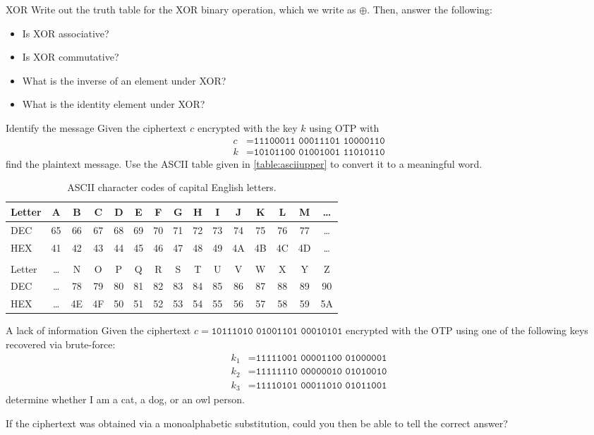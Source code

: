 \documentclass{practice}
\begin{document}
\begin{task}{XOR}
  Write out the truth table for the XOR binary operation, which we write as $\oplus$.
  Then, answer the following:
  \begin{itemize}
    \item Is XOR associative?
    \item Is XOR commutative?
    \item What is the inverse of an element under XOR?
    \item What is the identity element under XOR?
  \end{itemize}
\end{task}

\begin{task}{Identify the message}
  Given the ciphertext $c$ encrypted with the key $k$ using OTP with
  \begin{align*}
    c &= \texttt{11100011 00011101 10000110}\\
    k &= \texttt{10101100 01001001 11010110}
  \end{align*}
  find the plaintext message.
  Use the ASCII table given in \autoref{table:asciiupper} to convert it to a meaningful word.

  \begin{table}[h!]
    \centering
    \begin{tabular}{@{}lcccccccccccccc@{}}
      Letter & A  & B  & C  & D  & E  & F  & G  & H  & I  & J  & K  & L  & M & \dots\\\midrule
      DEC & 65 & 66 & 67 & 68 & 69 & 70 & 71 & 72 & 73 & 74 & 75 & 76 & 77 & \dots\\
      HEX & 41 & 42 & 43 & 44 & 45 & 46 & 47 & 48 & 49 & 4A & 4B & 4C & 4D & \dots\\\\
      Letter & \dots & N  & O  & P  & Q  & R  & S  & T  & U  & V  & W  & X  & Y  & Z\\\midrule
      DEC & \dots & 78 & 79 & 80 & 81 & 82 & 83 & 84 & 85 & 86 & 87 & 88 & 89 & 90\\
      HEX & \dots & 4E & 4F & 50 & 51 & 52 & 53 & 54 & 55 & 56 & 57 & 58 & 59 & 5A
    \end{tabular}
    \caption{ASCII character codes of capital English letters.}
    \label{table:asciiupper}
  \end{table}
\end{task}

\begin{task}{A lack of information}
  Given the ciphertext $c = \texttt{10111010 01001101 00010101}$ encrypted with the OTP using one of the following keys recovered via brute-force:
  \begin{align*}
    k_1 &= \texttt{11111001 00001100 01000001}\\
    k_2 &= \texttt{11111110 00000010 01010010}\\
    k_3 &= \texttt{11110101 00011010 01011001}
  \end{align*}
  determine whether I am a cat, a dog, or an owl person.

  If the ciphertext was obtained via a monoalphabetic substitution, could you then be able to tell the correct answer?
\end{task}
\end{document}
